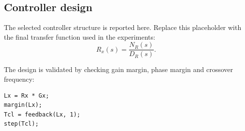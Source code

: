 \subsection{Controller design}

The selected controller structure is reported here. Replace this placeholder with the final transfer function used in the experiments:
\begin{equation}
    R_x(s) = \frac{N_R(s)}{D_R(s)}.
\end{equation}

The design is validated by checking gain margin, phase margin and crossover frequency:
\begin{lstlisting}[style=matlabstyle,caption={Frequency-based validation commands.}]
Lx = Rx * Gx;
margin(Lx);
Tcl = feedback(Lx, 1);
step(Tcl);
\end{lstlisting}
